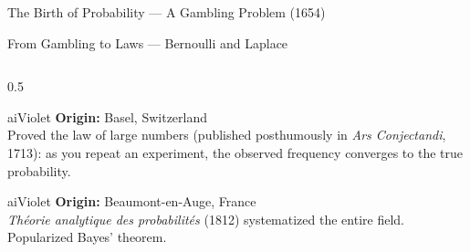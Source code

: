 \begin{frame}[shrink=4]{The Birth of Probability --- A Gambling Problem (1654)}
\end{frame}

\begin{frame}{From Gambling to Laws --- Bernoulli and Laplace}

  \begin{columns}[T]
    \begin{column}{0.5\textwidth}
      \begin{personbox}{aiViolet}
        \textbf{Origin:} Basel, Switzerland\\[3pt]
        Proved the \alert{law of large numbers} (published posthumously
        in \emph{Ars Conjectandi}, 1713): as you repeat an experiment,
        the observed frequency converges to the true probability.
      \end{personbox}

      \vspace{0.3em}
      \begin{personbox}{aiViolet}
        \textbf{Origin:} Beaumont-en-Auge, France\\[3pt]
        \emph{Th\'eorie analytique des probabilit\'es} (1812)
        systematized the entire field. Popularized Bayes' theorem.
      \end{personbox}
    \end{column}


\end{columns}
\end{frame}
